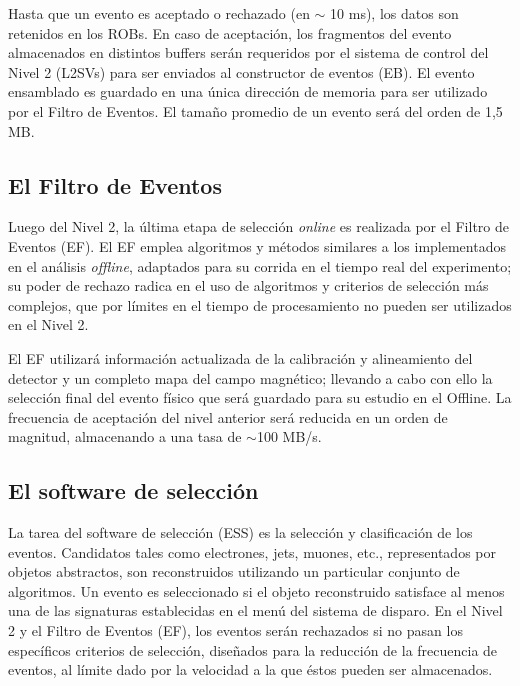   Hasta que un evento es aceptado o rechazado (en $\sim$ 10 ms), los datos son retenidos en los ROBs. En caso de aceptaci\'on, los fragmentos del evento almacenados en distintos buffers ser\'an requeridos por el sistema de control del Nivel 2 (L2SVs) para ser enviados al constructor de eventos (EB). El evento ensamblado es guardado en una \'unica direcci\'on de memoria para ser utilizado por el Filtro de Eventos. El tama\~no promedio de un evento ser\'a del orden de 1,5 MB.


\subsection{El Filtro de Eventos}

  Luego del Nivel 2, la \'ultima etapa de selecci\'on \emph{online} es realizada por el Filtro de Eventos (EF). El EF emplea algoritmos y m\'etodos similares a los implementados en el an\'alisis \emph{offline}, adaptados para su corrida en el tiempo real del experimento; su poder de rechazo radica en el uso de algoritmos y criterios de selecci\'on m\'as complejos, que por l\'imites en el tiempo de procesamiento no pueden ser utilizados en el Nivel 2.
  
  El EF utilizar\'a informaci\'on actualizada de la calibraci\'on y alineamiento del detector y un completo mapa del campo magn\'etico; llevando a cabo con ello la selecci\'on final del evento f\'isico que ser\'a guardado para su estudio en el Offline. La frecuencia de aceptaci\'on del nivel anterior ser\'a reducida en un orden de magnitud, almacenando a una tasa de $\sim$100 MB/s.


\subsection{El software de selecci\'on}
\label{'HLTalgos'}
   
 La tarea del software de selecci\'on (ESS) es la selecci\'on y clasificaci\'on de los eventos. Candidatos tales como electrones, jets, muones, etc., representados por objetos abstractos, son reconstruidos utilizando un particular conjunto de algoritmos. Un evento es seleccionado si el objeto reconstruido satisface al menos una de las signaturas establecidas en el men\'u del sistema de disparo. En el Nivel 2 y el Filtro de Eventos (EF), los eventos ser\'an rechazados si no pasan los espec\'ificos criterios de selecci\'on, dise\~nados para la reducci\'on de la frecuencia de eventos, al l\'imite dado por la velocidad a la que \'estos pueden ser almacenados.

